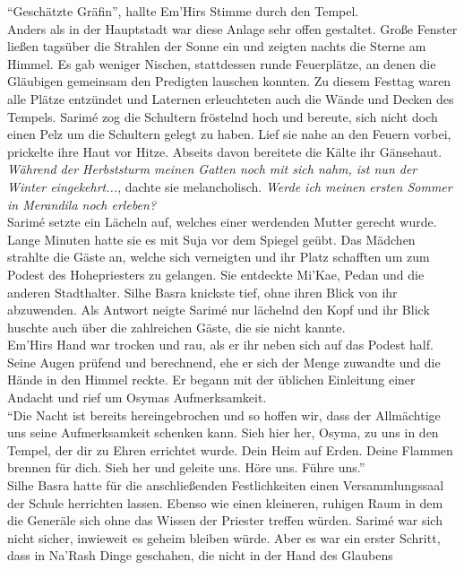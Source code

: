 ``Geschätzte Gräfin'', hallte Em'Hirs Stimme durch den Tempel.\\
Anders als in der Hauptstadt war diese Anlage sehr offen gestaltet. Große Fenster ließen tagsüber 
die Strahlen der Sonne ein und zeigten nachts die Sterne am Himmel. Es gab weniger Nischen, 
stattdessen runde Feuerplätze, an denen die Gläubigen gemeinsam den Predigten lauschen konnten. Zu 
diesem Festtag waren alle Plätze entzündet und Laternen erleuchteten auch die Wände und Decken des 
Tempels. Sarimé zog die Schultern fröstelnd hoch und bereute, sich nicht doch einen Pelz um die 
Schultern gelegt zu haben. Lief sie nahe an den Feuern vorbei, prickelte ihre Haut vor Hitze. 
Abseits davon bereitete die Kälte ihr Gänsehaut.\\
\textit{Während der Herbststurm meinen Gatten noch mit sich nahm, ist nun der Winter 
eingekehrt...}, dachte sie melancholisch. \textit{Werde ich meinen ersten Sommer in Merandila noch 
erleben?}\\
Sarimé setzte ein Lächeln auf, welches einer werdenden Mutter gerecht wurde. Lange Minuten hatte 
sie es mit Suja vor dem Spiegel geübt. Das Mädchen strahlte die Gäste an, welche sich verneigten 
und ihr Platz schafften um zum Podest des Hohepriesters zu gelangen. Sie entdeckte Mi'Kae, Pedan 
und die anderen Stadthalter. Silhe Basra knickste tief, ohne ihren Blick von ihr abzuwenden. Als 
Antwort neigte Sarimé nur lächelnd den Kopf und ihr Blick huschte auch über die zahlreichen Gäste, 
die sie nicht kannte.\\
Em'Hirs Hand war trocken und rau, als er ihr neben sich auf das Podest half. Seine Augen prüfend und 
berechnend, ehe er sich der Menge zuwandte und die Hände in den Himmel reckte. Er begann mit der 
üblichen Einleitung einer Andacht und rief um Osymas Aufmerksamkeit.\\
``Die Nacht ist bereits hereingebrochen und so hoffen wir, dass der Allmächtige uns seine 
Aufmerksamkeit schenken kann. Sieh hier her, Osyma, zu uns in den Tempel, der dir zu Ehren 
errichtet wurde. Dein Heim auf Erden. Deine Flammen brennen für dich. Sieh her und geleite uns. 
Höre uns. Führe uns.''\\
Silhe Basra hatte für die anschließenden Festlichkeiten einen Versammlungssaal der Schule 
herrichten lassen. Ebenso wie einen kleineren, ruhigen Raum in dem die Generäle sich ohne das
Wissen der Priester treffen würden. Sarimé war sich nicht sicher, inwieweit es geheim bleiben würde. 
Aber es war ein erster Schritt, dass in Na'Rash Dinge geschahen, die nicht in der Hand des Glaubens 
